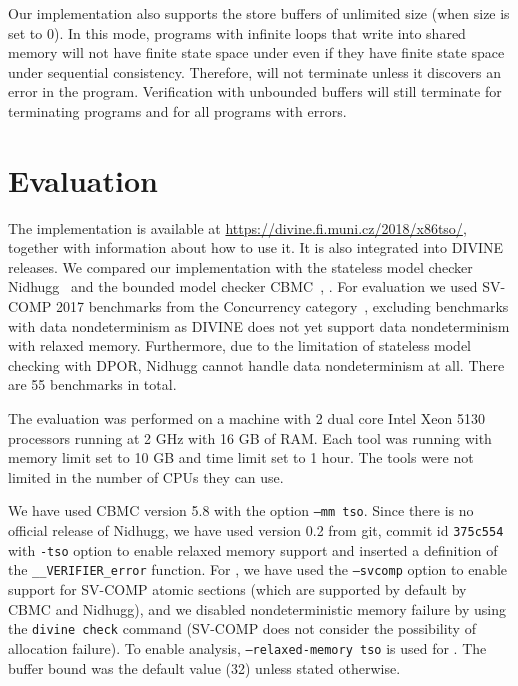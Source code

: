 Our implementation also supports the store buffers of unlimited size (when size
is set to 0). In this mode, programs with infinite loops that write into shared
memory will not have finite state space under \xtso even if they have finite
state space under sequential consistency.
Therefore, \divine will not terminate unless it discovers an error in the
program.
Verification with unbounded buffers will still terminate for terminating
programs and for all programs with errors.


\section{Evaluation} \label{sec:evaluation}

The implementation is available at \url{https://divine.fi.muni.cz/2018/x86tso/}, together with information about how to use it.
It is also integrated into DIVINE releases.
We compared our implementation with the stateless model checker Nidhugg~ and the bounded model checker CBMC~, .
For evaluation we used SV-COMP 2017 benchmarks from the Concurrency
category~, excluding benchmarks with data
nondeterminism as
DIVINE does not yet support data nondeterminism with relaxed memory.
Furthermore, due to the limitation of stateless model checking with DPOR,
Nidhugg cannot handle data nondeterminism at all.
There are 55 benchmarks in total.

The evaluation was performed on a machine with 2 dual core Intel Xeon 5130
processors running at 2 GHz with 16 GB of RAM. Each tool was running with memory
limit set to 10 GB and time limit set to 1 hour. The tools were not limited in
the number of CPUs they can use.

We have used CBMC version 5.8 with the option \texttt{--mm tso}. Since there is no official release of Nidhugg, we have used version 0.2 from git, commit id
\texttt{375c554} with \texttt{-tso} option to enable relaxed memory support and inserted a definition of the \texttt{\_\_VERIFIER\_error} function.
For \divine, we have used the \texttt{--svcomp} option to enable support for SV-COMP atomic sections (which are supported by default by CBMC and Nidhugg), and we disabled nondeterministic memory failure by using the \texttt{divine check} command (SV-COMP does not consider the possibility of allocation failure).
To enable \xtso analysis, \texttt{--relaxed-memory tso} is used for \divine.
The buffer bound was the default value (32) unless stated otherwise.


